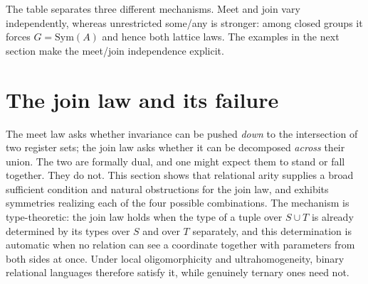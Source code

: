\documentclass{lmcs}
\newcommand{\Sym}{\mathrm{Sym}}
\begin{document}
The table separates three different mechanisms. Meet and join vary
independently, whereas unrestricted some/any is stronger: among closed groups
it forces $G=\Sym(A)$ and hence both lattice laws. The examples in the
next section make the meet/join independence explicit.

\section{The join law and its failure}\label{sec:join}

The meet law asks whether invariance can be pushed \emph{down} to the
intersection of two register sets; the join law asks whether it can be
decomposed \emph{across} their union. The two are formally dual, and
one might expect them to stand or fall together. They do not. This
section shows that relational arity supplies a broad sufficient
condition and natural obstructions for the join law, and exhibits
symmetries realizing each of the four possible combinations.
The mechanism is type-theoretic: the join law holds when the type of a tuple over $S\cup T$ is already determined by its types over $S$ and over $T$ separately, and this determination is automatic when no relation can see a coordinate together with parameters from both sides at once. Under local oligomorphicity and ultrahomogeneity, binary relational
languages therefore satisfy it, while genuinely ternary ones need not.
\end{document}
